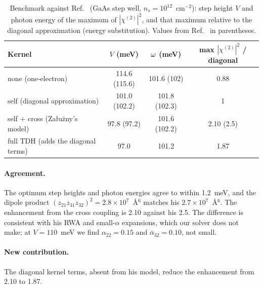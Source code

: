 \documentclass[11pt]{article}
\newcommand{\chitwo}{\chi^{(2)}}
\let\hbar\relax\DeclareRobustCommand{\hbar}{{\mathchar'26\mkern-9mu h}}
\begin{document}
\begin{table}[!t]\centering\small
\caption{Benchmark against Ref.~\cite{Zaluzny1995} (GaAs step well, $n_s=10^{12}$~cm$^{-2}$): step height $V$ and photon energy of the maximum of $|\chitwo|^2$, and that maximum relative to the diagonal approximation (energy substitution). Values from Ref.~\cite{Zaluzny1995} in parentheses.}
\label{tab:zal}
\begin{tabular}{lccc}
\toprule
Kernel & $V$ (meV) & $\hbar\omega$ (meV) & max $|\chitwo|^2$ / diagonal\\
\midrule
none (one-electron) & 114.6 (115.6) & 101.6 (102) & 0.88\\
self (diagonal approximation) & 101.0 (102.2) & 101.8 (102.3) & 1\\
self + cross (Załużny's model) & 97.8 (97.2) & 101.6 (102.2) & 2.10 (2.5)\\
full TDH (adds the diagonal terms) & 97.0 & 101.2 & 1.87\\
\bottomrule
\end{tabular}
\end{table}

\paragraph{Agreement.} The optimum step heights and photon energies agree to within 1.2~meV, and the dipole product $(z_{21}z_{31}z_{32})^2=2.8\times10^{7}$~\AA$^6$ matches his $2.7\times10^{7}$~\AA$^6$. The enhancement from the cross coupling is 2.10 against his 2.5. The difference is consistent with his RWA and small-$\alpha$ expansions, which our solver does not make; at $V=110$~meV we find $\alpha_{22}=0.15$ and $\bar\alpha_{32}=0.10$, not small.

\paragraph{New contribution.} The diagonal kernel terms, absent from his model, reduce the enhancement from 2.10 to 1.87.
\end{document}
